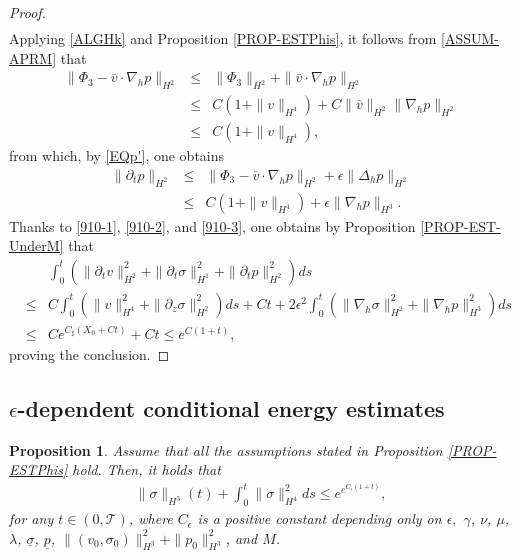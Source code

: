 \documentclass[12pt,reqno]{amsart}
\numberwithin{equation}{section}
\newtheorem{proposition}[theorem]{Proposition}
\begin{document}
\begin{proof}
\begin{eqnarray}
  \end{eqnarray}
  Applying \eqref{ALGHk} and Proposition \ref{PROP-ESTPhis}, it follows from \eqref{ASSUM-APRM} that
  \begin{eqnarray*}
    \|\Phi_3-\bar v\cdot\nabla_hp\|_{H^2}&\leq&\|\Phi_3\|_{H^2}+\|\bar v\cdot\nabla_hp\|_{H^2}\\
    &\leq&C(1+\|v\|_{H^4})+C\|\bar v\|_{H^2}\|\nabla_hp\|_{H^2}\\
    &\leq&C(1+\|v\|_{H^4}),
  \end{eqnarray*}
  from which, by \eqref{EQp'}, one obtains
  \begin{eqnarray}
    \|\partial_tp\|_{H^2}&\leq&\|\Phi_3-\bar v\cdot\nabla_hp\|_{H^2}+\epsilon\|\Delta_hp\|_{H^2}\nonumber\\
    &\leq&C(1+\|v\|_{H^4})+\epsilon\|\nabla_hp\|_{H^3}. \label{910-3}
  \end{eqnarray}
  Thanks to \eqref{910-1}, \eqref{910-2}, and \eqref{910-3}, one obtains by Proposition \ref{PROP-EST-UnderM} that
  \begin{eqnarray*}
    &&\int_0^t(\|\partial_tv\|_{H^2}^2+\|\partial_t\sigma\|_{H^1}^2+\|\partial_tp\|_{H^2}^2)ds\\
    &\leq&C\int_0^t(\|v\|_{H^4}^2+\|\partial_z\sigma\|_{H^2}^2)ds+Ct+2\epsilon^2\int_0^t(\|\nabla_h\sigma\|_{H^2}^2+\|\nabla_hp\|_{H^3}^2)ds\\
    &\leq& Ce^{C_\sharp(X_0+Ct)}+Ct\leq e^{C(1+t)},
  \end{eqnarray*}
  proving the conclusion.
\end{proof}

\subsection{$\epsilon$-dependent conditional energy estimates}
\begin{proposition}
\label{PROP-EST-Depep}
Assume that all the assumptions stated in Proposition \ref{PROP-ESTPhis} hold. Then, it holds that
\begin{align}
\|\sigma\|_{H^3}(t)+\int_0^t\|\sigma\|_{H^4}^2ds\leq e^{e^{C_\epsilon(1+t)}},
\end{align}
for any $t\in(0,\mathcal T)$,
where $C_\epsilon$ is a positive constant depending only on $\epsilon,$ $\gamma$, $\nu$, $\mu$,
$\lambda$, $\underline\sigma$, $\underline p$, $\|(v_0,\sigma_0)\|_{H^3}^2+\|p_0\|_{H^3}^2$, and $M$.
\end{proposition}
\end{document}

